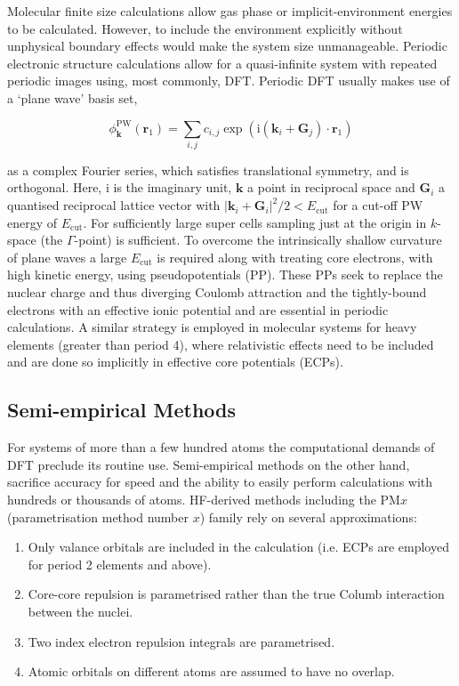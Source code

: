 \documentclass[main.tex]{subfiles}
\begin{document}
Molecular finite size calculations allow gas phase or implicit-environment energies to be calculated. However, to include the environment explicitly without unphysical boundary effects would make the system size unmanageable. Periodic electronic structure calculations allow for a quasi-infinite system with repeated periodic images using, most commonly, DFT.\cite{Hasnip2014} Periodic DFT usually makes use of a `plane wave' basis set,

\begin{equation}
	\phi_{\boldsymbol{k}}^\text{PW}(\boldsymbol{r}_1) = \sum_{i, j} c_{i, j}\exp(\text{i}(\boldsymbol{k}_i + \boldsymbol{G}_j)\cdot \boldsymbol{r}_1)
\end{equation}

as a complex Fourier series, which satisfies translational symmetry, and is orthogonal. Here, $\text{i}$ is the imaginary unit, $\boldsymbol{k}$ a point in reciprocal space and $\boldsymbol{G}_i$ a quantised reciprocal lattice vector with $|\boldsymbol{k}_i + \boldsymbol{G}_i|^2/2 < E_\text{cut}$ for a cut-off PW energy of $E_\text{cut}$.\cite{DFTPracticalIntro2009} For sufficiently large super cells sampling just at the origin in $k$-space (the $\Gamma$-point) is sufficient.\cite{Kratzer2019}
 To overcome the intrinsically shallow curvature of plane waves a large $E_\text{cut}$ is required along with treating core electrons, with high kinetic energy, using pseudopotentials (PP). These PPs seek to replace the nuclear charge and thus diverging Coulomb attraction and the tightly-bound electrons with an effective ionic potential and are essential in periodic calculations. A similar strategy is employed in molecular systems for heavy elements (greater than period 4), where relativistic effects need to be included and are done so implicitly in effective core potentials (ECPs).

\subsection{Semi-empirical Methods}

For systems of more than a few hundred atoms the computational demands of DFT preclude its routine use. Semi-empirical methods on the other hand, sacrifice accuracy for speed and the ability to easily perform calculations with hundreds or thousands of atoms.\cite{Christensen2016} HF-derived methods including the PM$x$ (parametrisation method number $x$) family rely on several approximations:

\begin{enumerate}
	\item Only valance orbitals are included in the calculation (i.e. ECPs are employed for period 2 elements and above).
	\item Core-core repulsion is parametrised rather than the true Columb interaction between the nuclei.
	\item Two index electron repulsion integrals are parametrised.
	\item Atomic orbitals on different atoms are assumed to have no overlap.
\end{enumerate}
\end{document}
